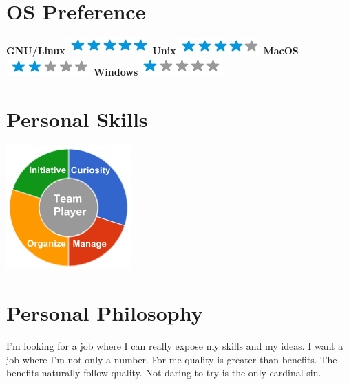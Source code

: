 \documentclass[]{friggeri-cv}
\begin{document}
\begin{aside}
  \section{OS Preference}
    \textbf{GNU/Linux}\includegraphics[scale=0.40]{img/5stars.png}
    \textbf{Unix}\includegraphics[scale=0.40]{img/4stars.png}
    \textbf{MacOS}\includegraphics[scale=0.40]{img/2stars.png}
    \textbf{Windows}\includegraphics[scale=0.40]{img/1stars.png}
    ~
  \section{Personal Skills}
    \includegraphics[scale=0.62]{img/personal.png}
    ~
\end{aside}

\section{Personal Philosophy}
    I'm looking for a job where I can really expose my skills and my ideas. I want a job where I'm not only a number. 
    For me quality is greater than benefits.
    The benefits naturally follow quality.
    Not daring to try is the only cardinal sin.
\end{document}
